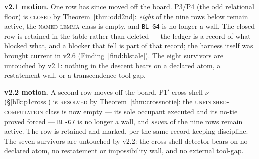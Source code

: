 \documentclass[11pt]{article}
\newcommand{\hx}[1]{\textcolor{cC}{\footnotesize\texttt{#1}}}
\theoremstyle{plain}
\theoremstyle{definition}
\theoremstyle{remark}
\begin{document}
\smallskip\noindent
\textbf{v2.1 motion.} One row has since moved off the board. P3/P4 (the odd
relational floor) is \textsc{closed} by Theorem~\ref{thm:odd2nd}: \emph{eight}
of the nine rows below remain active, the \textsc{named-lemma} class is empty,
and \hx{BL-G4} is no longer a wall. The closed row is retained in the table
rather than deleted --- the ledger is a record of what blocked what, and a
blocker that fell is part of that record; the harness itself was brought current
in v2.6 (Finding~\ref{find:blstale}).
The eight survivors are untouched by v2.1: nothing in the descent bears on a
declared atom, a restatement wall, or a transcendence tool-gap.

\smallskip\noindent
\textbf{v2.2 motion.} A second row moves off the board. P1$'$ cross-shell $\nu$
(\S\ref{blk:p1cross}) is \textsc{resolved} by Theorem~\ref{thm:crossnotie}: the
\textsc{unfinished-computation} class is now empty --- its sole occupant executed
and its no-tie proved forced --- \hx{BL-G7} is no longer a wall, and \emph{seven}
of the nine rows remain active. The row is retained and marked, per the same
record-keeping discipline. The seven survivors are untouched by v2.2: the
cross-shell detector bears on no declared atom, no restatement or impossibility
wall, and no external tool-gap.
\end{document}
